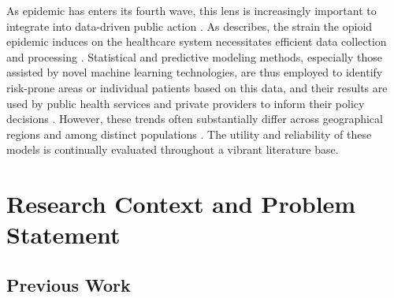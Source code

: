 \documentclass[journal]{IEEEtran}
\begin{document}
    As epidemic has enters its fourth wave, this lens is increasingly important to integrate into data-driven public action \cite{ciccaroneRiseIllicitFentanyls2021, juddOpioidEpidemicReview2023}. As \citeauthor{blancoDataNeedsModels2022} describes, the strain the opioid epidemic induces on the healthcare system necessitates efficient data collection and processing \cite{blancoDataNeedsModels2022}. Statistical and predictive modeling methods, especially those assisted by novel machine learning technologies, are thus employed to identify risk-prone areas or individual patients based on this data, and their results are used by public health services and private providers to inform their policy decisions \cite{blancoDataNeedsModels2022, sharmaAIDrivenPatientRisk2023}. However, these trends often substantially differ across geographical regions and among distinct populations \cite{wilkesDemographicRegionalComparison2021}. The utility and reliability of these models is continually evaluated throughout a vibrant literature base.


    \section{Research Context and Problem Statement}

    \subsection{Previous Work}
\end{document}
